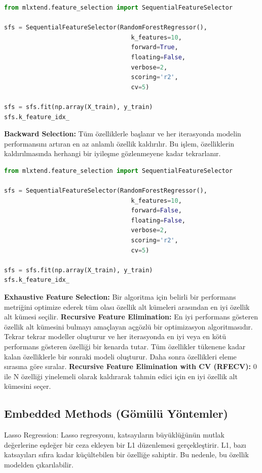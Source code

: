 \begin{lstlisting}[language=Python]
from mlxtend.feature_selection import SequentialFeatureSelector

sfs = SequentialFeatureSelector(RandomForestRegressor(), 
								   k_features=10, 
								   forward=True, 
								   floating=False, 
								   verbose=2,
								   scoring='r2',
								   cv=5)

sfs = sfs.fit(np.array(X_train), y_train)
sfs.k_feature_idx_
\end{lstlisting}

\textbf{Backward Selection:} Tüm özelliklerle başlanır ve her iterasyonda modelin performansını artıran en az anlamlı özellik kaldırılır. Bu işlem, özelliklerin kaldırılmasında herhangi bir iyileşme gözlenmeyene kadar tekrarlanır.

\begin{lstlisting}[language=Python]
from mlxtend.feature_selection import SequentialFeatureSelector

sfs = SequentialFeatureSelector(RandomForestRegressor(), 
								   k_features=10, 
								   forward=False, 
								   floating=False, 
								   verbose=2,
								   scoring='r2',
								   cv=5)

sfs = sfs.fit(np.array(X_train), y_train)
sfs.k_feature_idx_
\end{lstlisting}

\textbf{Exhaustive Feature Selection:} Bir algoritma için belirli bir performans metriğini optimize ederek tüm olası özellik alt kümeleri arasından en iyi özellik alt kümesi seçilir.\newline
\textbf{Recursive Feature Elimination:} En iyi performans gösteren özellik alt kümesini bulmayı amaçlayan açgözlü bir optimizasyon algoritmasıdır. Tekrar tekrar modeller oluşturur ve her iterasyonda en iyi veya en kötü performans gösteren özelliği bir kenarda tutar. Tüm özellikler tükenene kadar kalan özelliklerle bir sonraki modeli oluşturur. Daha sonra özellikleri eleme sırasına göre sıralar.\newline
\textbf{Recursive Feature Elimination with CV (RFECV):} 0 ile N özelliği yinelemeli olarak kaldırarak tahmin edici için en iyi özellik alt kümesini seçer.

\newpage

\subsection{Embedded Methods (Gömülü Yöntemler)}
Lasso Regression: Lasso regresyonu, katsayıların büyüklüğünün mutlak değerlerine eşdeğer bir ceza ekleyen bir L1 düzenlemesi gerçekleştirir. L1, bazı katsayıları sıfıra kadar küçültebilen bir özelliğe sahiptir. Bu nedenle, bu özellik modelden çıkarılabilir.

